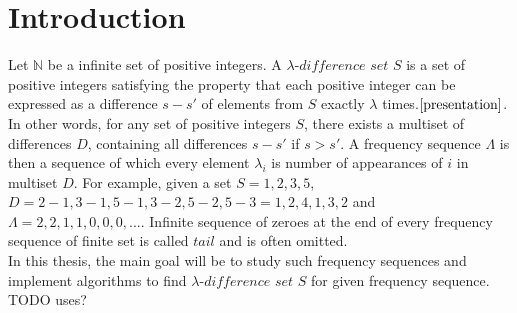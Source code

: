 \chapter{Introduction}
Let $\mathbb{N}$ be a infinite set of positive integers. A $\lambda \textit{-difference set S}$ is a set of positive integers satisfying the property that each positive integer can be expressed as a difference $s - s'$ of elements from $S$  exactly $\lambda$ times.$\cite{presentation}$. In other words, for any set of positive integers $S$, there exists a multiset of differences $D$, containing all differences $s - s'$ if $s > s'$. A frequency sequence $\Lambda$ is then a sequence of which every element $\lambda_i$ is number of appearances of $i$ in multiset $D$. For example, given a set $S = {1,2,3,5}$, $D = {2-1, 3-1, 5-1, 3-2, 5-2, 5-3} = {1,2,4,1,3,2}$ and $\Lambda = {2,2,1,1,0,0,0,...}$. Infinite sequence of zeroes at the end of every frequency sequence of finite set is called $\textit{tail}$ and is often  omitted.
\\

 In this thesis, the main goal will be to study such frequency sequences and implement algorithms to find $\lambda \textit{-difference set S}$ for given frequency sequence. 
 \\
 TODO uses?